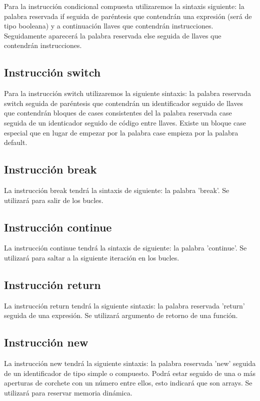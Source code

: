 \documentclass{article}
\begin{document}
Para la instrucción condicional compuesta utilizaremos la sintaxis siguiente: la palabra reservada if seguida de paréntesis que contendrán una expresión (será de tipo booleana) y a continuación llaves que contendrán instrucciones. Seguidamente aparecerá la palabra reservada else seguida de llaves que contendrán instrucciones.

\subsection{Instrucción switch}

Para la instrucción switch utilizaremos la siguiente sintaxis: la palabra reservada switch seguida de paréntesis que contendrán un identificador seguido de llaves que contendrán bloques de cases consistentes del la palabra reservada case seguida de un identicador seguido de código entre llaves. Existe un bloque case especial que en lugar de empezar por la palabra case empieza por la palabra default.

\subsection{Instrucción break}

La instrucción break tendrá la sintaxis de siguiente: la palabra 'break'. Se utilizará para salir de los bucles.

\subsection{Instrucción continue}

La instrucción continue tendrá la sintaxis de siguiente: la palabra 'continue'. Se utilizará para saltar a la siguiente iteración en los bucles.

\subsection{Instrucción return}

La instrucción return tendrá la siguiente sintaxis: la palabra reservada 'return' seguida de una expresión. Se utilizará argumento de retorno de una función.

\subsection{Instrucción new}

La instrucción new tendrá la siguiente sintaxis: la palabra reservada 'new' seguida de un identificador de tipo simple o compuesto. Podrá estar seguido de una o más aperturas de corchete con un número entre ellos, esto indicará que son arrays. Se utilizará para reservar memoria dinámica.
\end{document}
